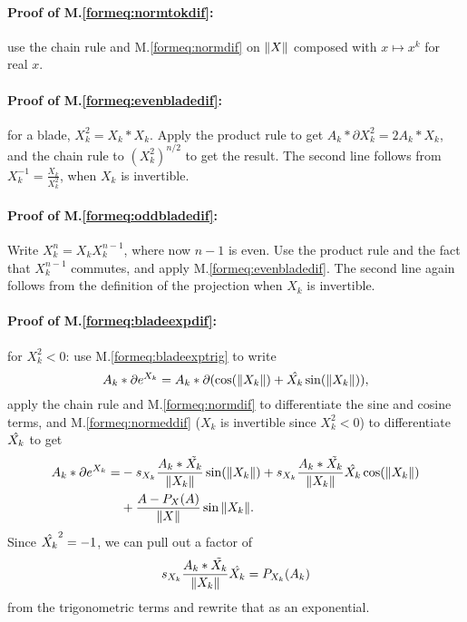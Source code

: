 \documentclass[a4paper,12pt]{article}
\newcommand{\meqref}[1]{M.\eqref{form#1}}
\theoremstyle{definition}
\begin{document}
\paragraph{Proof of \meqref{eq:normtokdif}:} use the chain rule and \meqref{eq:normdif} on $\left\lVert X\right\rVert$ composed with $x \mapsto x^k$ for real $x$.

\paragraph{Proof of \meqref{eq:evenbladedif}:} for a blade, $X_k^2 = X_k * X_k$.
Apply the product rule to get $A_k*\partial X_k^2 = 2 A_k * X_k$, and the chain rule to $(X_k^2)^{n/2}$ to get the result.
The second line follows from $X_k^{-1} = \frac{X_k}{X_k^2}$, when $X_k$ is invertible.

\paragraph{Proof of \meqref{eq:oddbladedif}:} Write $X_k^n = X_k X_k^{n-1}$, where now $n-1$ is even.
Use the product rule and the fact that $X_k^{n-1}$ commutes, and apply \meqref{eq:evenbladedif}.
The second line again follows from the definition of the projection when $X_k$ is invertible.

\paragraph{Proof of \meqref{eq:bladeexpdif}:} for $X_k^2 < 0$: use \meqref{eq:bladeexptrig} to write
\begin{equation}
A_k * \partial e^{X_k} = A_k * \partial(\cos(\left\lVert X_k\right\rVert) + \hat{X_k} \sin(\left\lVert X_k\right\rVert)),
\end{equation}
apply the chain rule and \meqref{eq:normdif} to differentiate the sine and cosine terms, and \meqref{eq:normeddif} ($X_k$ is invertible since $X_k^2 < 0$) to differentiate $\hat{X_k}$ to get
\begin{equation}
\begin{split}
A_k * \partial e^{X_k} =& -s_{X_k}\frac{A_k*\tilde{X_k}}{\left\lVert X_k\right\rVert}\sin(\left\lVert X_k\right\rVert) + s_{X_k}\frac{A_k*\tilde{X_k}}{\left\lVert X_k\right\rVert} \hat{X_k} \cos(\left\lVert X_k\right\rVert)\\
 &+ \frac{A- P_{X}(A)}{\left\lVert X\right\rVert} \sin{\left\lVert X_k\right\rVert}.
\end{split}
\end{equation}
Since $\hat{X_k}^2 = -1$, we can pull out a factor of
\begin{equation*}
s_{X_k}\frac{A_k*\tilde{X_k}}{\left\lVert X_k\right\rVert}\hat{X_k} = P_{X_k}(A_k)
\end{equation*}
from the trigonometric terms and rewrite that as an exponential.
\end{document}
